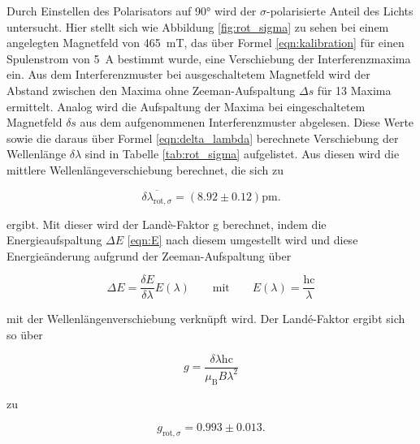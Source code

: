             \FloatBarrier

            Durch Einstellen des Polarisators auf 90° wird der $\sigma$-polarisierte Anteil des Lichts untersucht. Hier stellt sich wie Abbildung \ref{fig:rot_sigma} zu sehen bei einem angelegten Magnetfeld von 
            \SI{465}{\milli\tesla}, das über Formel \ref{eqn:kalibration} für einen Spulenstrom von \SI{5}{\ampere} bestimmt wurde, eine Verschiebung der Interferenzmaxima ein. Aus dem Interferenzmuster bei 
            ausgeschaltetem Magnetfeld wird der Abstand zwischen den Maxima ohne Zeeman-Aufspaltung $\Delta s$
            für 13 Maxima ermittelt. Analog wird die Aufspaltung der Maxima bei eingeschaltetem Magnetfeld $\delta s$ aus dem aufgenommenen Interferenzmuster abgelesen. Diese Werte sowie die daraus über Formel
            \ref{eqn:delta_lambda} berechnete Verschiebung der Wellenlänge $\delta\lambda$ sind in Tabelle \ref{tab:rot_sigma} aufgelistet. Aus diesen wird die mittlere Wellenlängeverschiebung berechnet, die sich 
            zu

            \begin{equation*}
                \overline{\delta \lambda_{\text{rot}, \sigma}} = \left(8.92 \pm 0.12\right)\si{\pico\metre}.
            \end{equation*}

            ergibt. Mit dieser wird der Landè-Faktor g berechnet, indem die Energieaufspaltung $\Delta E$ \ref{eqn:E} nach diesem umgestellt wird und diese Energieänderung aufgrund der 
            Zeeman-Aufspaltung über 

            \begin{equation*}
                \Delta E = \frac{\delta E}{\delta \lambda} E(\lambda) \qquad \text{mit} \qquad E(\lambda) = \frac{\text{hc}}{\lambda}
            \end{equation*}

            mit der Wellenlängenverschiebung verknüpft wird. Der Landé-Faktor ergibt sich so über
            
            \begin{equation}
              g = \frac{\delta\lambda\text{hc}}{\mu_{\text{B}}B\lambda^2}
              \label{eqn:Lande}
            \end{equation}
            
            zu

            \begin{equation*}
                g_{\text{rot}, \sigma} = 0.993 \pm 0.013 .
            \end{equation*}


